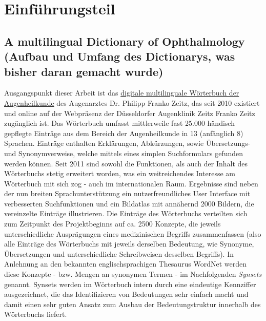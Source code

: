 \documentclass[pagesize,DIV=calc,12pt,draft]{scrreprt}
\begin{document}

\chapter{Einführungsteil}

\section{A multilingual Dictionary of Ophthalmology (Aufbau und Umfang des Dictionarys, was bisher daran gemacht wurde)}

Ausgangspunkt dieser Arbeit ist das \href{http://www.zeitzfrankozeitz.de/index.php/fachwoerterbuch.html}{digitale multilinguale Wörterbuch der Augenheilkunde} des Augenarztes Dr. 
Philipp Franko Zeitz, das seit 2010 existiert und online auf der Webpräsenz der Düsseldorfer Augenklinik Zeitz Franko Zeitz zugänglich ist. Das Wörterbuch umfasst mittlerweile fast 25.000 händisch gepflegte Einträge aus dem Bereich der Augenheilkunde in 13 (anfänglich 8) Sprachen. 
Einträge enthalten Erklärungen, Abkürzungen, sowie Übersetzungs- und Synonymverweise, welche mittels eines simplen Suchformulars gefunden werden können. 
Seit 2011 sind sowohl die Funktionen, als auch der Inhalt des Wörterbuchs stetig erweitert worden, was ein weitreichendes Interesse am Wörterbuch mit sich zog - auch im internationalen Raum. 
Ergebnisse sind neben der nun breiten Sprachunterstützung ein nutzerfreundliches User Interface mit verbesserten Suchfunktionen und ein Bildatlas mit annähernd 2000 Bildern, die vereinzelte Einträge illustrieren. Die Einträge des Wörterbuchs verteilten sich zum Zeitpunkt des Projektbeginns auf ca. 2500 Konzepte, die jeweils unterschiedliche Ausprägungen eines medizinischen Begriffs zusammenfassen (also alle Einträge des Wörterbuchs mit jeweils derselben Bedeutung, wie Synonyme, Übersetzungen und unterschiedliche Schreibweisen desselben Begriffs). 
In Anlehnung an den bekannten englischsprachigen Thesaurus WordNet werden diese Konzepte - bzw. 
Mengen an synonymen Termen - im Nachfolgenden \emph{Synsets} genannt. 
Synsets werden im Wörterbuch intern durch eine eindeutige Kennziffer ausgezeichnet, die das Identifizieren von Bedeutungen sehr einfach macht und damit einen sehr guten Ansatz zum Ausbau der Bedeutungstruktur innerhalb des Wörterbuchs liefert.
\end{document}
